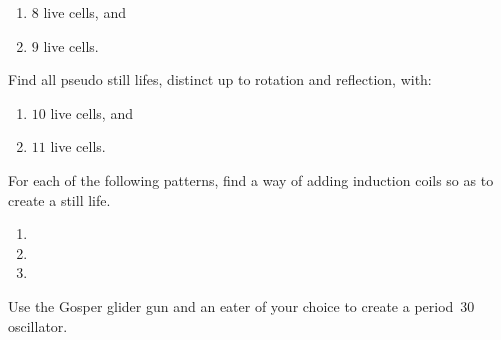 \begin{multicols}{2}
\begin{problem}
		\begin{enumerate}[label=\bf\color{ocre}(\alph*)]
			\item $8$ live cells, and
			
			\item $9$ live cells.
		\end{enumerate}
	\end{problem}
	
	
	\mfilbreak
	
	
	\begin{problem}\label{exer:small_pseudo_still_lifes}
		Find all pseudo still lifes, distinct up to rotation and reflection, with:\smallskip
		
		\begin{enumerate}[label=\bf\color{ocre}(\alph*)]
			\item $10$ live cells, and
			
			\item $11$ live cells.
		\end{enumerate}
	\end{problem}
	
	
	\mfilbreak
	
	
	\begin{problemstar}\label{exer:still_life_add_coil}
		For each of the following patterns, find a way of adding induction coils so as to create a still life.\vspace*{-0.25cm}
		
		\begin{multicols}{2}\setlength{\columnsep}{1pt}
			\begin{enumerate}[label=(\alph*),series=exer_induction_coil]
				\item[\bf\color{ocre}(a)] 
				
				\item[\bf\color{ocre}(c)] 
				
				\item[\bf\color{ocre}(b)] 
			\end{enumerate}
		\end{multicols}
	\end{problemstar}
	
	
	\mfilbreak
	
	
	\begin{problem}\label{exer:gosper_oscillator}
		Use the Gosper glider gun and an eater of your choice to create a period~30 oscillator.
	\end{problem}
	

\end{multicols}

